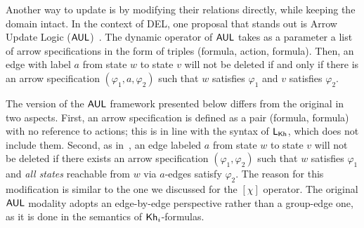 Another way to update \ltss is by modifying their relations directly, while keeping the domain intact. In the context of DEL, one proposal that stands out is Arrow Update Logic ($\mathsf{AUL}$)~\cite{KooiR11}. The dynamic operator of $\mathsf{AUL}$ takes as a parameter a list of arrow specifications in the form of triples (formula, action, formula). Then, an edge with label $a$ from state $w$ to state $v$ will not be deleted if and only if there is an arrow specification $(\varphi_1, a, \varphi_2)$ such that $w$ satisfies $\varphi_1$ and $v$ satisfies $\varphi_2$. 

The version of the $\mathsf{AUL}$ framework presented below differs from the original in two aspects. First, an arrow specification is defined as a pair (formula, formula) with no reference to actions; this is in line with the syntax of $\mathsf{L}_{\sf Kh}$, which does not include them. 
Second, as in~, an edge labeled $a$ from state $w$ to state $v$ will not be deleted if there exists an arrow specification $(\varphi_1, \varphi_2)$ such that $w$ satisfies $\varphi_1$ and \emph{all states} reachable from $w$ via $a$-edges satisfy $\varphi_2$. The reason for this modification is similar to the one we discussed for the $[\chi]$ operator. The original $\mathsf{AUL}$ modality adopts an edge-by-edge perspective rather than a group-edge one, as it is done in the semantics of ${\sf Kh}_i$-formulas.




